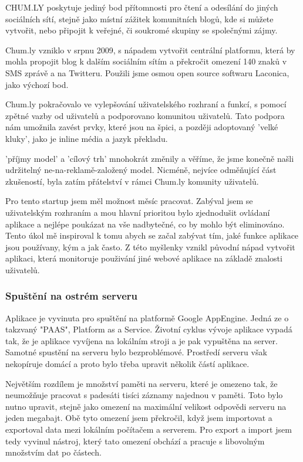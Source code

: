\documentclass[bc,female,java,dept456]{diploma}						%
\begin{document}
CHUM.LY poskytuje jediný bod přítomnosti pro čtení a odesílání do jiných sociálních sítí, stejně jako místní zážitek komunitních blogů, kde si můžete vytvořit, nebo připojit k veřejné, či soukromé skupiny se společnými zájmy.

Chum.ly vzniklo v srpnu 2009, s nápadem vytvořit centrální platformu, která by mohla propojit blog k dalším sociálním sítím a překročit omezení 140 znaků v SMS zprávě a na Twitteru. Použili jsme osmou open source softwaru Laconica, jako výchozí bod.

Chum.ly pokračovalo ve vylepšování uživatelského rozhraní a funkcí, s pomocí zpětné vazby od uživatelů a podporovano komunitou uživatelů. Tato podpora nám umožnila zavést prvky, které jsou na špici, a později adoptovaný 'velké kluky', jako je inline média a jazyk překladu.

'příjmy model' a 'cílový trh' mnohokrát změnily a věříme, že jsme konečně našli udržitelný ne-na-reklamě-založený model. Nicméně, nejvíce odměňující část zkušeností, byla zatím přátelství v rámci Chum.ly komunity uživatelů.





Pro tento startup jsem měl možnost měsíc pracovat. Zabýval jsem se uživatelským rozhraním a mou hlavní prioritou bylo zjednodušit ovládaní aplikace a nejlépe poukázat na vše nadbytečné, co by mohlo být eliminováno. Tento úkol mě inspiroval k tomu abych se začal zabývat tím, jaké funkce aplikace jsou používany, kým a jak často. Z této myšlenky vznikl původní nápad vytvořit aplikaci, která monitoruje použivání jiné webové aplikace na základě znalosti uživatelů.

\subsubsection{Spuštění na ostrém serveru}

Aplikace je vyvinuta pro spuštění na platformě Google AppEngine. Jedná ze o takzvaný "PAAS", Platform as a Service. Životní cyklus vývoje aplikace vypadá tak, že je aplikace vyvíjena na lokálním stroji a je pak vypuštěna na server. Samotné spustění na serveru bylo bezproblémové. Prostředí serveru však nekopíruje domácí a proto bylo třeba upravit několik částí aplikace.

Největším rozdílem je množství paměti na serveru, které je omezeno tak, že neumožňuje pracovat s padesáti tisíci záznamy najednou v paměti. Toto bylo nutno upravit, stejně jako omezení na maximální velikost odpovědi serveru na jeden megabajt. Obě tyto omezení jsem překročil, když jsem importovat a exportoval data mezi lokálním počítačem a serverem. Pro export a import jsem tedy vyvinul nástroj, který tato omezení obchází a pracuje s libovolným množstvím dat po částech.
\end{document}
